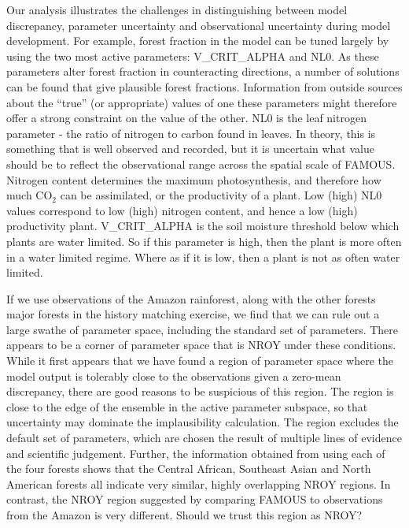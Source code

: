 \documentclass[esd, article]{copernicus} %
\begin{document}
Our analysis illustrates the challenges in distinguishing between model discrepancy, parameter uncertainty and observational uncertainty during model development. For example, forest fraction in the model can be tuned largely by using the two most active parameters: V\_CRIT\_ALPHA and NL0.  As these parameters alter forest fraction in counteracting directions, a number of solutions can be found that give plausible forest fractions. Information from outside sources about the ``true'' (or appropriate) values of one these parameters might therefore offer a strong constraint on the value of the other. NL0 is the leaf nitrogen parameter - the ratio of nitrogen to carbon found in leaves. In theory, this is something that is well observed and recorded, but it is  uncertain what value should be to reflect the observational range across the spatial scale of FAMOUS. Nitrogen content determines the maximum photosynthesis, and therefore how much CO$_2$ can be assimilated, or the productivity of a plant. Low (high) NL0 values correspond to low (high) nitrogen content, and hence a low (high) productivity plant. V\_CRIT\_ALPHA is the soil moisture threshold below which plants are water limited.  So if this parameter is high, then the plant is more often in a water limited regime. Where as if it is low, then a plant is not as often water limited.

If we use observations of the Amazon rainforest, along with the other forests major forests in the history matching exercise, we find that we can rule out a large swathe of parameter space, including the standard set of parameters. There appears to be a corner of parameter space that is NROY under these conditions. While it first appears that we have found a region of parameter space where the model output is tolerably close to the observations given a zero-mean discrepancy, there are good reasons to be suspicious of this region. The region is close to the edge of the ensemble in the active parameter subspace, so that uncertainty may dominate the implausibility calculation. The region excludes the default set of parameters, which are chosen the result of multiple lines of evidence and scientific judgement. Further, the information obtained from using each of the four forests shows that the Central African, Southeast Asian and North American forests all indicate very similar, highly overlapping NROY regions. In contrast, the NROY region suggested by comparing FAMOUS to observations from the Amazon is very different. Should we trust this region as NROY? 
\end{document}
